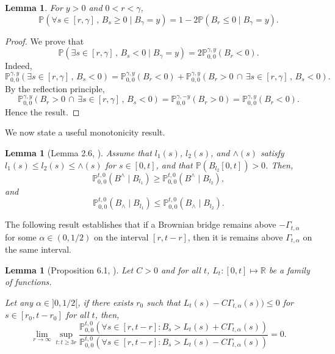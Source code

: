 \documentclass{article}
\newtheorem{lemma}[theorem]{Lemma}
\newcommand{\Prob}{\mathbb{P}}
\begin{document}
\begin{lemma}\label{reflectionprinciple0}
For $y>0$ and $0<r<\gamma$,
\begin{equation}
    \Prob(\forall s \in [r, \gamma] \, , \, B_s \geq 0 \mid B_\gamma = y ) = 1- 2\Prob(B_r \leq 0 \mid B_\gamma = y ).
\end{equation}
\end{lemma}
\begin{proof}
    We prove that 
    \begin{equation}
        \Prob(\exists s \in [r, \gamma] \, , \, B_s < 0 \mid B_\gamma = y ) =2\Prob_{0,0}^{\gamma,y}(B_r<0).
    \end{equation}
    Indeed,
    \begin{equation}
        \Prob_{0,0}^{\gamma,y}(\exists s \in [r, \gamma] \, , \, B_s < 0)= \Prob_{0,0}^{\gamma,y}(B_r<0) + \Prob_{0,0}^{\gamma,y}(B_r>0 \, \cap \, \exists s \in [r, \gamma] \, , \, B_s < 0 ).
    \end{equation}
    By the reflection principle,
    \begin{equation}
        \Prob_{0,0}^{\gamma,y}(B_r>0 \, \cap \, \exists s \in [r, \gamma] \, , \, B_s < 0 )=\Prob_{0,0}^{\gamma,-y}(B_r>0 )=\Prob_{0,0}^{\gamma,y}(B_r<0 ).
    \end{equation}
    Hence the result.
\end{proof}

We now state a useful monotonicity result.
\begin{lemma}[Lemma 2.6, \cite{Bramson1983ConvergenceOS}]\label{monoticitypath}
    Assume that $l_1(s)$, $l_2(s)$, and $\wedge(s)$ satisfy $l_1(s)\leq l_2(s) \leq \wedge(s)$ for $s\in [0,t]$, and that $\Prob(B_{l_2}[0,t])>0$. Then,
    \begin{equation}
        \Prob_{0,0}^{t,0}(B^{\wedge}\mid B_{l_1})\geq \Prob_{0,0}^{t,0}(B^{\wedge}\mid B_{l_2}),
    \end{equation}
    and
    \begin{equation}
        \Prob_{0,0}^{t,0}(B_{\wedge}\mid B_{l_1})\leq \Prob_{0,0}^{t,0}(B_{\wedge}\mid B_{l_2}).
    \end{equation}
\end{lemma}

The following result establishes that if a Brownian bridge remains above \(-\Gamma_{t,\alpha}\) for some \(\alpha \in (0,1/2)\) on the interval \([r, t - r]\), then it is remains above \(\Gamma_{t,\alpha}\) on the same interval.
\begin{lemma}[Proposition 6.1, \cite{Bramson1983ConvergenceOS}]\label{prop61bramson}
    Let $C>0$ and for all $t$, $L_t : [0,t]\mapsto \mathbb{R}$ be a family of functions.

Let any $\alpha \in ]0,1/2[$, if there exists $r_0$ such that $L_t(s) -C\Gamma_{t,\alpha}(s)) \leq 0$ for $s \in [r_0,t-r_0]$ for all $t$, then,
\begin{equation}
        \lim_{r\to \infty}\sup_{t: t\geq 3r}\frac{\Prob_{0,0}^{t,0}( \forall s \in [r,t-r] : B_s > L_t(s) +C\Gamma_{t,\alpha}(s))}{\Prob_{0,0}^{t,0}( \forall s \in [r,t-r] : B_s > L_t(s) -C\Gamma_{t,\alpha}(s))} =0.
    \end{equation}
\end{lemma}
\end{document}
